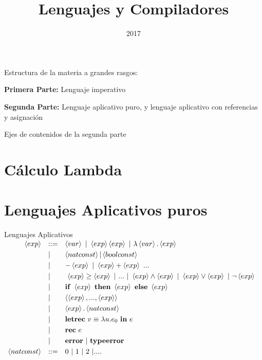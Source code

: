 \documentclass{beamer}
\title{Lenguajes y Compiladores}
\date{2017}
\newcommand{\var}{\left\langle var\right\rangle}
\newcommand{\ife}{\mathbf{if}\ }
\newcommand{\thene}{\ \mathbf{then}\ }
\newcommand{\elsee}{\ \mathbf{else}\ }
\newcommand{\ex}{\left\langle exp\right\rangle}
\newcommand{\natconst}{\left\langle natconst\right\rangle}
\newcommand{\boolconst}{\left\langle boolconst\right\rangle}
\begin{document}
\begin{frame}
  \titlepage
\end{frame}


\begin{frame}{Estructura de la materia a grandes rasgos:}

\textbf{Primera Parte: } Lenguaje imperativo

\bigskip


\textbf{Segunda Parte: } Lenguaje aplicativo puro, y lenguaje aplicativo con referencias y asignación

\end{frame}

\begin{frame}{Ejes de contenidos de la segunda parte}
  \tableofcontents
\end{frame}

\section{Cálculo Lambda}



\section{Lenguajes Aplicativos puros}


\begin{frame}{Lenguajes Aplicativos}
$
\begin{array}{rlllll}
\ex & ::= & \var\  |\  \ex \ex\ |\ \lambda\var.\ex \smallskip\\
    &  |   & \natconst | \boolconst       \smallskip\\
& | & -\ex \ |\ \ex + \ex  \ ...   \smallskip\\
& | & \ \ex\geq \ex \ |\ ...\ | \ \ex\wedge \ex  \ |\ \ex\vee \ex \ |\ \neg\ex\smallskip\\
& | & \ife \ex\thene \ex\elsee \ex\smallskip\\
& | & \langle \ex,...,\ex\rangle\smallskip\\
& | & \ex.\natconst\smallskip\\
& | & \textbf{letrec}\ v\equiv \lambda u.e_0\ \textbf{in}\ e \smallskip\\
& | & \textbf{rec}\ e \smallskip\\
& | & \textbf{error}\ |\ \textbf{typeerror}\smallskip\\
\natconst & ::= & 0\ |\ 1\ |\ 2\ | ....\smallskip\\
\end{array}
$

\end{frame}
\end{document}
